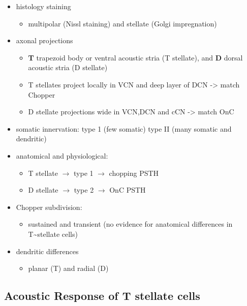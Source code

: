 \begin{itemize}
\item histology staining
\begin{itemize}
\item multipolar (Nissl staining) and stellate (Golgi impregnation) \citep{Osen:1969,BrawerMorestEtAl:1974,Lorente:1981}
\end{itemize}
\item axonal projections
\begin{itemize}
\item \textbf{T} trapezoid body or ventral acoustic stria (T stellate), and \textbf{D} dorsal acoustic stria (D stellate) \citep{OertelWuEtAl:1990}
\item T stellates project locally in VCN and deep layer of DCN -> match Chopper \citep{RhodeOertelEtAl:1983,SmithRhode:1989}
\item D stellate projections wide in VCN,DCN and cCN -> match OnC  \citep{SmithRhode:1989}
\end{itemize}
\item somatic innervation: type 1 (few somatic) type II (many somatic and dendritic) \citep{Cant:1981}
\item anatomical and physiological: \citet{SmithRhode:1989}
\begin{itemize}
\item T stellate $\rightarrow$ type 1 $\rightarrow$ chopping PSTH
\item D stellate $\rightarrow$ type 2 $\rightarrow$ OnC PSTH
\end{itemize}
\item Chopper subdivision:
\begin{itemize}
\item sustained and transient (no evidence for anatomical differences in T\~{}stellate cells)
\end{itemize}
\item dendritic differences \citep{DoucetRyugo:1997,DoucetRyugo:2006}
\begin{itemize}
\item planar (T) and radial (D)
\end{itemize}
\end{itemize}
\subsection{Acoustic Response of T stellate cells}
\label{sec-1_2}



